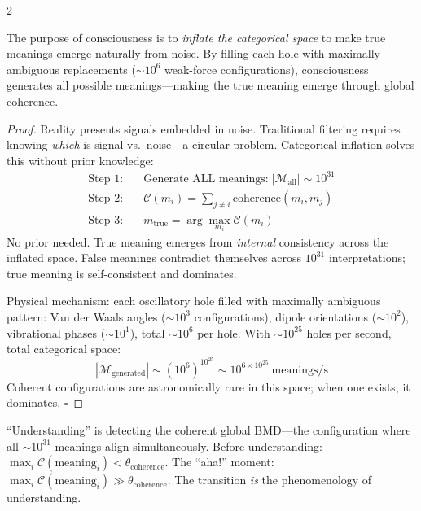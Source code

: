 \begin{multicols}{2}

\begin{theorem}
\label{thm:consciousness_purpose}
The purpose of consciousness is to \emph{inflate the categorical space} to
make true meanings emerge naturally from noise.  By filling each hole with
maximally ambiguous replacements ($\sim10^6$ weak-force configurations),
consciousness generates all possible meanings---making the true meaning
emerge through global coherence.
\end{theorem}

\begin{proof}
Reality presents signals embedded in noise.  Traditional filtering requires
knowing \emph{which} is signal vs.\ noise---a circular problem.  Categorical
inflation solves this without prior knowledge:
\begin{align}
\text{Step 1:} &\quad \text{Generate ALL meanings:}\; |\mathcal{M}_{\text{all}}| \sim 10^{31} \\
\text{Step 2:} &\quad \mathcal{C}(m_i) = \sum_{j\neq i}\text{coherence}(m_i,m_j) \\
\text{Step 3:} &\quad m_{\text{true}} = \arg\max_{m_i}\mathcal{C}(m_i)
\end{align}
No prior needed.  True meaning emerges from \emph{internal} consistency
across the inflated space.  False meanings contradict themselves across
$10^{31}$ interpretations; true meaning is self-consistent and dominates.

Physical mechanism: each oscillatory hole filled with maximally ambiguous
pattern: Van der Waals angles ($\sim10^3$ configurations), dipole orientations
($\sim10^2$), vibrational phases ($\sim10^1$), total $\sim10^6$ per hole.
With $\sim10^{25}$ holes per second, total categorical space:
\begin{equation}
|\mathcal{M}_{\text{generated}}| \sim (10^6)^{10^{25}} \sim 10^{6\times10^{25}}~\text{meanings/s}
\end{equation}
Coherent configurations are astronomically rare in this space; when one
exists, it dominates. $\square$
\end{proof}

\begin{corollary}
\label{cor:understanding}
``Understanding'' is detecting the coherent global BMD---the configuration
where all $\sim10^{31}$ meanings align simultaneously.  Before understanding:
$\max_i \mathcal{C}(\text{meaning}_i) < \theta_{\text{coherence}}$.  The
``aha!'' moment: $\max_i \mathcal{C}(\text{meaning}_i) \gg \theta_{\text{coherence}}$.
The transition \emph{is} the phenomenology of understanding.
\end{corollary}


\end{multicols}

